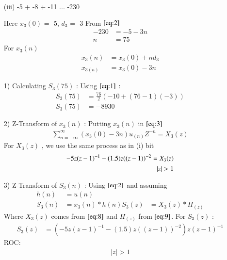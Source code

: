 \documentclass[journal,12pt,twocolumn]{IEEEtran}
\theoremstyle{remark}
\begin{document}
\begin{enumerate}
\vspace{1.5cm} 
\item[(iii)]
-5 + -8 + -11 ... -230
\vspace{0.2cm}

Here $x_3(0)$ = -5, $d_3$ = -3\vspace{0.05cm}
From $\eqref{eq:2}$
\begin{align}
-230 &= -5 -3n \\
n &= 75
\end{align}
For $x_3(n)$
\begin{align}
x_3(n) &= x_3(0) + nd_3\\
x_{3(n)} &= x_3(0) - 3n
\end{align}


\item[1)]
Calculating $S_3(75)$ :
Using $\eqref{eq:1}$ :\vspace{0.05cm}
\begin{align}
    S_3(75) &= \frac{76}{2}(-10+(76-1)(-3))\\
   S_3(75) &= -8930
    \end{align}

\item[2)] 
Z-Transform of $x_3(n)$ :
Putting $x_3(n)$ in $\eqref{eq:3}$
\vspace{0.05cm}
\begin{align}
\sum_{n=-\infty}^{\infty}(x_3(0) -3n)u_{(n)}Z^{-n} =X_3(z)
\end{align}
For $X_3(z)$ , we use the same process as in (i) bit\vspace{0.05cm}
\begin{align}
  \notag -5z(z-1)^{-1}-
       (1.5)z((z-1))^{-2}=X_3(z) \label{eq:8}\\
           \lvert z\rvert  >  1 
\end{align}

    \vspace{0.7cm}
\item[3)]
Z-Transform of $S_3(n)$ :
Using $\eqref{eq:2}$ and assuming 
\begin{align}
         h(n) &= u(n) \\
    S_3(n) &= x_3(n) * h(n) 
    S_3(z) &= X_3(z) * H_(z)
    \end{align}
    Where $X_3(z)$ comes from $\eqref{eq:8}$ and $H_(z)$ from $\eqref{eq:9}$.
    \vspace{0.05cm}
    For $S_3(z)$ :
    \begin{align}
            S_3(z) &= (-5z(z-1)^{-1}-
       (1.5)z((z-1))^{-2})z(z-1)^{-1}
    \end{align}
    ROC:
    \begin{align} 
    \lvert z \rvert > 1
    \end{align}
    

\end{enumerate}
\end{document}
